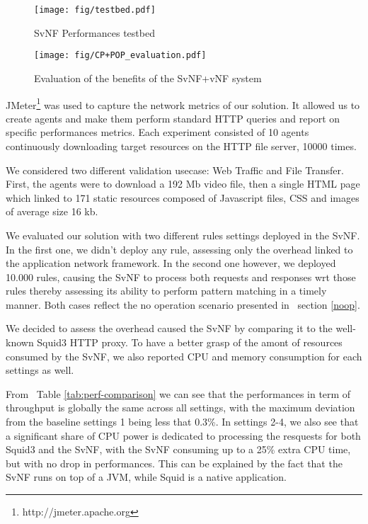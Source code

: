 \begin{figure}
  \begin{center}
    \texttt{[image: fig/testbed.pdf]}
  \end{center}
  \caption{ SvNF Performances testbed
    \label{fig:testbed}
  }
\end{figure}	


\begin{figure*}
  \begin{center}
    \texttt{[image: fig/CP+POP\_evaluation.pdf]}
  \end{center}
  \caption{ Evaluation of the benefits of the SvNF+vNF system
    \label{fig:cppopeval}
  }
\end{figure*}	







JMeter\footnote{http://jmeter.apache.org} was used to capture the network metrics of our solution.
It allowed us to create agents and make them perform standard HTTP queries and report on specific performances metrics. Each experiment consisted of 10 agents continuously downloading target resources on the HTTP file server, 10000 times.

We considered two different validation usecase: Web Traffic and File Transfer. First, the agents were to download a 192 Mb video file, then a single HTML page which linked to 171 static resources composed of Javascript files, CSS and images of average size 16 kb.

We evaluated our solution with two different rules settings deployed in the SvNF. In the first one, we didn't deploy any rule, assessing only the overhead linked to the application network framework. In the second one however, we deployed 10.000 rules, causing the SvNF to process both requests and responses wrt those rules thereby assessing its ability to perform pattern matching in a timely manner. Both cases reflect the no operation scenario presented in ~section \ref{noop}.

We decided to assess the overhead caused the SvNF by comparing it to the well-known Squid3 HTTP proxy. To have a better grasp of the amont of resources consumed by the SvNF, we also reported CPU and memory consumption for each settings as well.

From ~Table \ref{tab:perf-comparison} we can see that the performances in term of throughput is globally the same across all settings, with the maximum deviation from the baseline settings 1 being less that 0.3\%.
In settings 2-4, we also see that a significant share of CPU power is dedicated to processing the resquests for both Squid3 and the SvNF, with the SvNF consuming up to a 25\% extra CPU time, but with no drop in performances. This can be explained by the fact that the SvNF runs on top of a JVM, while Squid is a native application.

